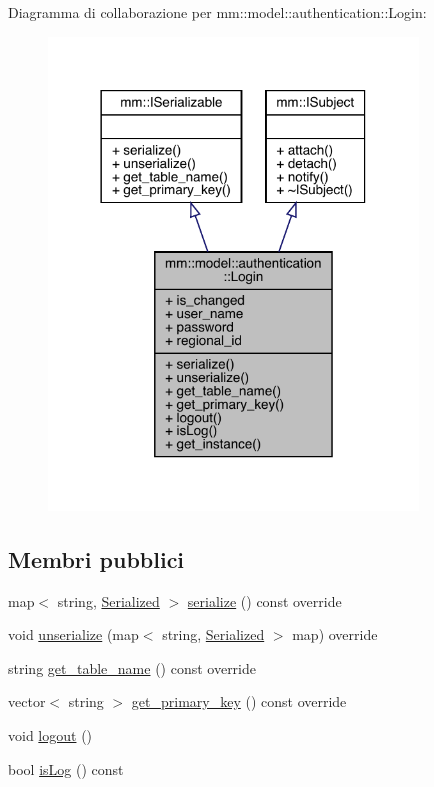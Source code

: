Diagramma di collaborazione per mm\+:\+:model\+:\+:authentication\+:\+:Login\+:\nopagebreak
\begin{figure}[H]
\begin{center}
\leavevmode
\includegraphics[width=278pt]{d8/dc8/structmm_1_1model_1_1authentication_1_1_login__coll__graph}
\end{center}
\end{figure}
\subsection*{Membri pubblici}
\begin{DoxyCompactItemize}
\item 
map$<$ string, \hyperlink{structmm_1_1_serialized}{Serialized} $>$ \hyperlink{structmm_1_1model_1_1authentication_1_1_login_a69ec1a769ef1659b8ed39d5e23c24333}{serialize} () const override
\item 
void \hyperlink{structmm_1_1model_1_1authentication_1_1_login_ac2429ce08624b0c425feced836b77d62}{unserialize} (map$<$ string, \hyperlink{structmm_1_1_serialized}{Serialized} $>$ map) override
\item 
string \hyperlink{structmm_1_1model_1_1authentication_1_1_login_afc72adef91be3d97ce4751b8a2357613}{get\+\_\+table\+\_\+name} () const override
\item 
vector$<$ string $>$ \hyperlink{structmm_1_1model_1_1authentication_1_1_login_a56f5da26be2d64baa78d0c81d99c8221}{get\+\_\+primary\+\_\+key} () const override
\item 
void \hyperlink{structmm_1_1model_1_1authentication_1_1_login_a23843b088a1c1e0a668e9013ca6768ad}{logout} ()
\item 
bool \hyperlink{structmm_1_1model_1_1authentication_1_1_login_aec29ca0fab75c7691c7939970646b39b}{is\+Log} () const
\end{DoxyCompactItemize}
